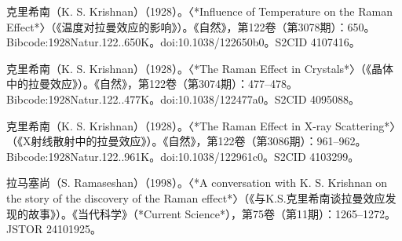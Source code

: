 \begin{enumerate}
克里希南（K. S. Krishnan）（1928）。〈*Influence of Temperature on the Raman Effect*〉（《温度对拉曼效应的影响》）。《自然》，第122卷（第3078期）：650。Bibcode:1928Natur.122..650K。doi:10.1038/122650b0。S2CID 4107416。

克里希南（K. S. Krishnan）（1928）。〈*The Raman Effect in Crystals*〉（《晶体中的拉曼效应》）。《自然》，第122卷（第3074期）：477–478。Bibcode:1928Natur.122..477K。doi:10.1038/122477a0。S2CID 4095088。

克里希南（K. S. Krishnan）（1928）。〈*The Raman Effect in X-ray Scattering*〉（《X射线散射中的拉曼效应》）。《自然》，第122卷（第3086期）：961–962。Bibcode:1928Natur.122..961K。doi:10.1038/122961c0。S2CID 4103299。

拉马塞尚（S. Ramaseshan）（1998）。〈*A conversation with K. S. Krishnan on the story of the discovery of the Raman effect*〉（《与K.S.克里希南谈拉曼效应发现的故事》）。《当代科学》（*Current Science*），第75卷（第11期）：1265–1272。JSTOR 24101925。

\end{enumerate}